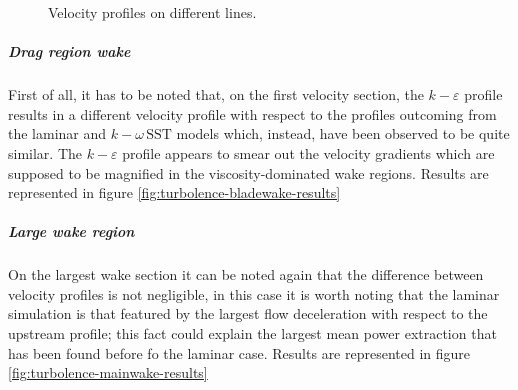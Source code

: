 \documentclass[a4paper,12pt]{article}
\newcommand{\kepsilon}{$k\!-\!\varepsilon $ }
\newcommand{\komegasst}{$k\!-\!\omega \, \text{SST} $ }
\begin{document}
\begin{figure}[H]
\centering
{}
\caption{Velocity profiles on different lines.}
\end{figure}

\subparagraph{Drag region wake}
First of all, it has to be noted that, on the first velocity section, the \kepsilon profile results in a different velocity profile with respect to the profiles outcoming from the laminar and \komegasst models which, instead, have been observed to be quite similar.
The \kepsilon profile appears to smear out the velocity gradients which are supposed to be magnified in the viscosity-dominated wake regions.
Results are represented in figure \ref{fig:turbolence-bladewake-results}

\subparagraph{Large wake region}
On the largest wake section it can be noted again that the difference between velocity profiles is not negligible, in this case it is worth noting that the laminar simulation is that featured by the largest flow deceleration with respect to the upstream profile; this fact could explain the largest mean power extraction that has been found before fo the laminar case.
Results are represented in figure \ref{fig:turbolence-mainwake-results}
\end{document}
